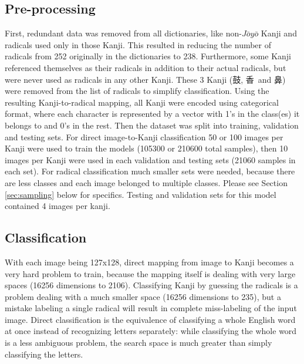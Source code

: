 \documentclass{article}
\begin{document}
\begin{CJK*}{UTF8}{min}
\subsection{Pre-processing}
First, redundant data was removed from all dictionaries, like non-$J\bar{o}y\bar{o}$ Kanji and radicals used only in those Kanji. This resulted in reducing the number of radicals from 252 originally in the dictionaries to 238. Furthermore, some Kanji referenced themselves as their radicals in addition to their actual radicals, but were never used as radicals in any other Kanji. These 3 Kanji (鼓, 香\ and 鼻) were removed from the list of radicals to simplify classification. Using the resulting Kanji-to-radical mapping, all Kanji were encoded using categorical format, where each character is represented by a vector with 1's in the class(es) it belongs to and 0's in the rest. Then the dataset was split into training, validation and testing sets. For direct image-to-Kanji classification 50 or 100 images per Kanji were used to train the models (105300 or 210600 total samples), then 10 images per Kanji were used in each validation and testing sets (21060 samples in each set). For radical classification much smaller sets were needed, because there are less classes and each image belonged to multiple classes. Please see Section \ref{sec:sampling} below for specifics. Testing and validation sets for this model contained 4 images per kanji.

\subsection{Classification}
With each image being 127x128, direct mapping from image to Kanji becomes a very hard problem to train, because the mapping itself is dealing with very large spaces (16256 dimensions to 2106). Classifying Kanji by guessing the radicals is a problem dealing with a much smaller space (16256 dimensions to 235), but a mistake labeling a single radical will result in complete miss-labeling of the input image. Direct classification is the equivalence of classifying a whole English word at once instead of recognizing letters separately: while classifying the whole word is a less ambiguous problem, the search space is much greater than simply classifying the letters.


\end{CJK*}
\end{document}
